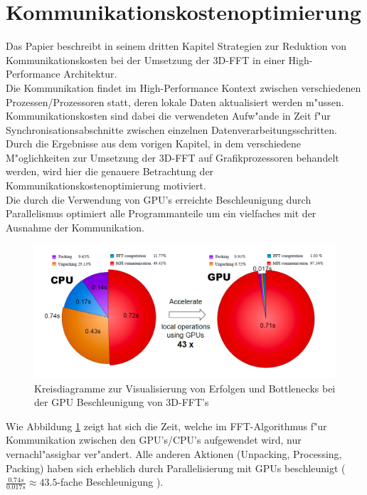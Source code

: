 \section{Kommunikationskostenoptimierung}
Das Papier \cite[Kap.3]{mainpaper} beschreibt in seinem dritten Kapitel Strategien zur Reduktion von Kommunikationskosten bei der Umsetzung der 3D-FFT in einer High-Performance Architektur.\\

Die Kommunikation findet im High-Performance Kontext zwischen verschiedenen Prozessen/Prozessoren statt, deren lokale Daten aktualisiert werden m"ussen.\\
Kommunikationskosten sind dabei die verwendeten Aufw"ande in Zeit f"ur Synchronisationsabschnitte zwischen einzelnen Datenverarbeitungsschritten.\\

Durch die Ergebnisse aus dem vorigen Kapitel, in dem verschiedene M"oglichkeiten zur Umsetzung der 3D-FFT auf Grafikprozessoren behandelt werden, wird hier die genauere Betrachtung der Kommunikationskostenoptimierung motiviert.\\

Die durch die Verwendung von GPU's erreichte Beschleunigung durch Parallelismus optimiert alle Programmanteile um ein vielfaches mit der Ausnahme der Kommunikation.\\

\begin{figure}
\centering
  \includegraphics[width=\linewidth]{res/speedup.png}
  \caption{\cite[Abb. 3]{mainpaper} Kreisdiagramme zur Visualisierung von Erfolgen und Bottlenecks bei der GPU Beschleunigung von 3D-FFT's}
  \label{fig:speedup}
\end{figure}

Wie Abbildung \ref{fig:speedup} zeigt hat sich die Zeit, welche im FFT-Algorithmus f"ur Kommunikation zwischen den GPU's/CPU's aufgewendet wird, nur vernachl"assigbar ver"andert. Alle anderen Aktionen (Unpacking, Processing, Packing) haben sich erheblich durch Parallelisierung mit GPUs beschleunigt ($ \frac{0.74s}{0.017s} \approx 43.5$-fache Beschleunigung ).\\

